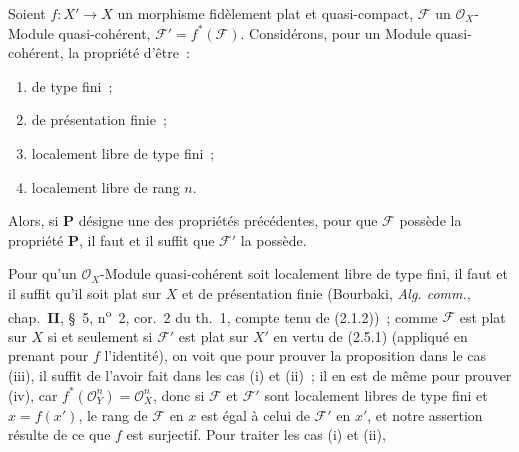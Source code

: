 \begin{proposition}[2.5.2]
Soient $f:X'\to X$ un morphisme fidèlement plat et quasi-compact,
$\mathscr F$ un $\mathcal O_X$-Module quasi-cohérent,
$\mathscr F'=f^*(\mathscr F)$. Considérons, pour un Module quasi-cohérent, la
propriété d'être~:
\begin{enumerate}
\item[\textup{(i)}] de type fini~;
\item[\textup{(ii)}] de présentation finie~;
\item[\textup{(iii)}] localement libre de type fini~;
\item[\textup{(iv)}] localement libre de rang $n$.
\end{enumerate}
Alors, si $\boldsymbol{P}$ désigne une des propriétés précédentes, pour que
$\mathscr F$ possède la propriété $\boldsymbol{P}$, il faut et il suffit que
$\mathscr F'$ la possède.
\end{proposition}

Pour qu'un $\mathcal O_X$-Module quasi-cohérent soit localement libre de type
fini, il faut et il suffit qu'il soit plat sur $X$ et de présentation finie
(Bourbaki, \emph{Alg. comm.}, chap.~\textbf{II}, \S~5, n\textsuperscript{o}~2,
cor.~2 du th.~1, compte tenu de (2.1.2))~; comme $\mathscr F$ est plat sur
$X$ si et seulement si $\mathscr F'$ est plat sur $X'$ en vertu de (2.5.1)
(appliqué en prenant pour $f$ l'identité), on voit que pour prouver la
proposition dans le cas (iii), il suffit de l'avoir fait dans les cas (i) et
(ii)~; il en est de même pour prouver (iv), car
$f^*(\mathcal O_Y^n)=\mathcal O_X^n$, donc si $\mathscr F$ et
$\mathscr F'$ sont localement libres de type fini et $x=f(x')$, le rang de
$\mathscr F$ en $x$ est égal à celui de $\mathscr F'$ en $x'$, et notre
assertion résulte de ce que $f$ est surjectif. Pour traiter les cas (i) et
(ii),
